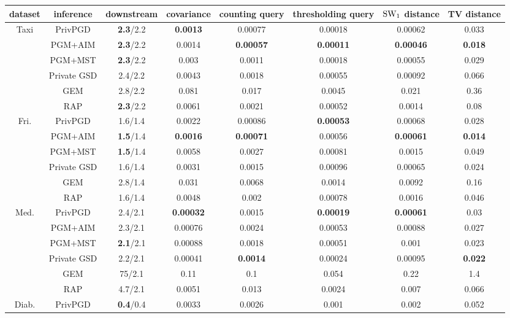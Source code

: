 \begin{table}[ht]
\footnotesize
\centering
\begin{tabular}{cccccccc}
\toprule
dataset & inference & downstream & covariance & counting query & thresholding query & $\text{SW}_1$ distance & TV distance \\
\midrule \multirow{6}{*}{Taxi } & PrivPGD&\textbf{2.3}/2.2 & \textbf{0.0013} & 0.00077 & 0.00018 & 0.00062 & 0.033 \\
 & PGM+AIM&\textbf{2.3}/2.2 & 0.0014 & \textbf{0.00057} & \textbf{0.00011} & \textbf{0.00046} & \textbf{0.018} \\
 & PGM+MST&\textbf{2.3}/2.2 & 0.003 & 0.0011 & 0.00018 & 0.00055 & 0.029 \\
 & Private GSD&2.4/2.2 & 0.0043 & 0.0018 & 0.00055 & 0.00092 & 0.066 \\
 & GEM&2.8/2.2 & 0.081 & 0.017 & 0.0045 & 0.021 & 0.36 \\
 & RAP&\textbf{2.3}/2.2 & 0.0061 & 0.0021 & 0.00052 & 0.0014 & 0.08 \\
\midrule \multirow{6}{*}{Fri. } & PrivPGD&1.6/1.4 & 0.0022 & 0.00086 & \textbf{0.00053} & 0.00068 & 0.028 \\
 & PGM+AIM&\textbf{1.5}/1.4 & \textbf{0.0016} & \textbf{0.00071} & 0.00056 & \textbf{0.00061} & \textbf{0.014} \\
 & PGM+MST&\textbf{1.5}/1.4 & 0.0058 & 0.0027 & 0.00081 & 0.0015 & 0.049 \\
 & Private GSD&1.6/1.4 & 0.0031 & 0.0015 & 0.00096 & 0.00065 & 0.024 \\
 & GEM&2.8/1.4 & 0.031 & 0.0068 & 0.0014 & 0.0092 & 0.16 \\
 & RAP&1.6/1.4 & 0.0048 & 0.002 & 0.00078 & 0.0016 & 0.046 \\
\midrule \multirow{6}{*}{Med. } & PrivPGD&2.4/2.1 & \textbf{0.00032} & 0.0015 & \textbf{0.00019} & \textbf{0.00061} & 0.03 \\
 & PGM+AIM&2.3/2.1 & 0.00076 & 0.0024 & 0.00053 & 0.00088 & 0.027 \\
 & PGM+MST&\textbf{2.1}/2.1 & 0.00088 & 0.0018 & 0.00051 & 0.001 & 0.023 \\
 & Private GSD&2.2/2.1 & 0.00041 & \textbf{0.0014} & 0.00024 & 0.00095 & \textbf{0.022} \\
 & GEM&75/2.1 & 0.11 & 0.1 & 0.054 & 0.22 & 1.4 \\
 & RAP&4.7/2.1 & 0.0051 & 0.013 & 0.0024 & 0.007 & 0.066 \\
\midrule \multirow{6}{*}{Diab. } & PrivPGD&\textbf{0.4}/0.4 & 0.0033 & 0.0026 & 0.001 & 0.002 & 0.052 \\

\end{tabular}
\end{table}

